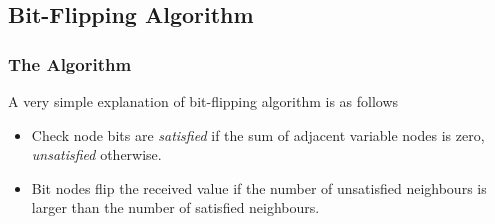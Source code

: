 \subsection{Bit-Flipping Algorithm}
\begin{frame}
\frametitle{The Algorithm}   %
A very simple explanation of bit-flipping algorithm is as follows
\begin{itemize}
	\item Check node bits are \textit{satisfied} if the sum of adjacent variable nodes is zero, \textit{unsatisfied} otherwise.
	\item Bit nodes flip the received value if the number of unsatisfied neighbours is larger than the number of satisfied neighbours.
\end{itemize}
\end{frame}



